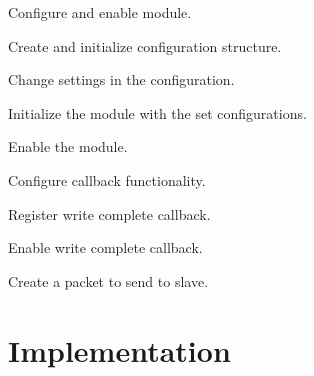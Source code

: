 \begin{DoxyEnumerate}
\item Configure and enable module. 
\begin{DoxyCodeInclude}{0}
\end{DoxyCodeInclude}

\begin{DoxyEnumerate}
\item Create and initialize configuration structure. 
\begin{DoxyCodeInclude}{0}
\end{DoxyCodeInclude}

\item Change settings in the configuration. 
\begin{DoxyCodeInclude}{0}
\end{DoxyCodeInclude}

\item Initialize the module with the set configurations. 
\begin{DoxyCodeInclude}{0}
\end{DoxyCodeInclude}

\item Enable the module. 
\begin{DoxyCodeInclude}{0}
\end{DoxyCodeInclude}

\end{DoxyEnumerate}
\item Configure callback functionality. 
\begin{DoxyCodeInclude}{0}
\end{DoxyCodeInclude}

\begin{DoxyEnumerate}
\item Register write complete callback. 
\begin{DoxyCodeInclude}{0}
\end{DoxyCodeInclude}

\item Enable write complete callback. 
\begin{DoxyCodeInclude}{0}
\end{DoxyCodeInclude}

\end{DoxyEnumerate}
\item Create a packet to send to slave. 
\begin{DoxyCodeInclude}{0}
\end{DoxyCodeInclude}
 
\end{DoxyEnumerate}\hypertarget{asfdoc_sam0_sercom_i2c_master_callback_use_case_asfdoc_sam0_sercom_i2c_master_callback_use_case_implementation}{}\section{Implementation}\label{asfdoc_sam0_sercom_i2c_master_callback_use_case_asfdoc_sam0_sercom_i2c_master_callback_use_case_implementation}
